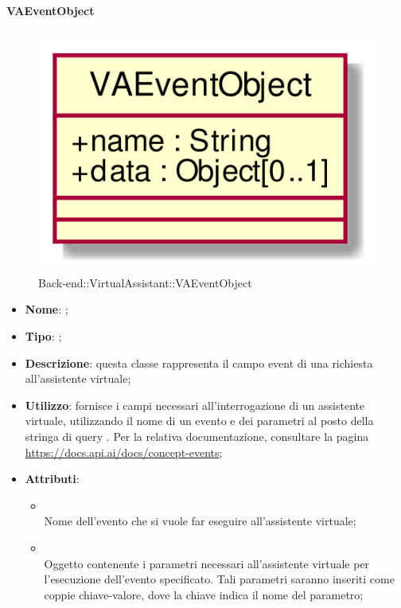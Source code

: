 \hypertarget{VAEventObject_label}{\paragraph{VAEventObject}}
\begin{figure}[h]
	\centering
	\includegraphics[width=\textwidth,height=\textheight,keepaspectratio]{images/ClassVAEventObject.png}
	\caption{Back-end::VirtualAssistant::VAEventObject}
\end{figure}
\begin{itemize}
	\item \textbf{Nome}: ;
	\item \textbf{Tipo}: ;
	\item \textbf{Descrizione}: questa classe rappresenta il campo event di una richiesta all'assistente virtuale;
	\item \textbf{Utilizzo}: fornisce i campi necessari all'interrogazione di un assistente virtuale, utilizzando il nome di un evento e dei parametri al posto della stringa di query .
Per la relativa documentazione, consultare la pagina \url{https://docs.api.ai/docs/concept-events};
	\item \textbf{Attributi}:
	\begin{itemize}
		\item[]  \\
		Nome dell'evento che si vuole far eseguire all'assistente virtuale;
		\item[]  \\
		Oggetto contenente i parametri necessari all'assistente virtuale per l'esecuzione dell'evento specificato. Tali parametri saranno inseriti come coppie chiave-valore, dove la chiave indica il nome del parametro;
	\end{itemize}
\end{itemize}
\FloatBarrier

